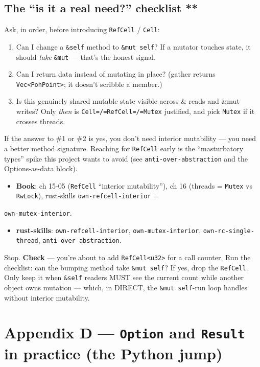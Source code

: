 \documentclass[11pt]{article}
\begin{document}
\subsection{The ``is it a real need?'' checklist **}
\label{sec:org9d9a47f}

Ask, in order, before introducing \texttt{RefCell} / \texttt{Cell}:

\begin{enumerate}
\item Can I change a \texttt{\&self} method to \texttt{\&mut self}? If a mutator touches state,
it should \emph{take} \texttt{\&mut} — that's the honest signal.
\item Can I return data instead of mutating in place? (gather returns \texttt{Vec<PohPoint>};
it doesn't scribble a member.)
\item Is this genuinely shared mutable state visible across \& reads and \&mut
writes? Only \emph{then} is \texttt{Cell=/=RefCell=/=Mutex} justified, and pick \texttt{Mutex}
if it crosses threads.
\end{enumerate}

If the answer to \#1 or \#2 is yes, you don't need interior mutability — you need
a better method signature. Reaching for \texttt{RefCell} early is the ``masturbatory
types'' spike this project wants to avoid (see \texttt{anti-over-abstraction} and the
Options-as-data block).

\begin{itemize}
\item \textbf{\textbf{Book}}: ch 15-05 (\texttt{RefCell} ``interior mutability''), ch 16 (threads =
\texttt{Mutex} vs \texttt{RwLock}), rust-skills \texttt{own-refcell-interior} =
\end{itemize}
\texttt{own-mutex-interior}.
\begin{itemize}
\item \textbf{\textbf{rust-skills}}: \texttt{own-refcell-interior}, \texttt{own-mutex-interior},
\texttt{own-rc-single-thread}, \texttt{anti-over-abstraction}.
\end{itemize}

Stop. \textbf{\textbf{Check}} — you're about to add \texttt{RefCell<u32>} for a call counter. Run
the checklist: can the bumping method take \texttt{\&mut self}? If yes, drop the
\texttt{RefCell}. Only keep it when \texttt{\&self} readers MUST see the current count while
another object owns mutation — which, in DIRECT, the \texttt{\&mut self}-run loop
handles without interior mutability.
\section{Appendix D — \texttt{Option} and \texttt{Result} in practice (the Python jump)}
\label{sec:org82575e4}
\end{document}
